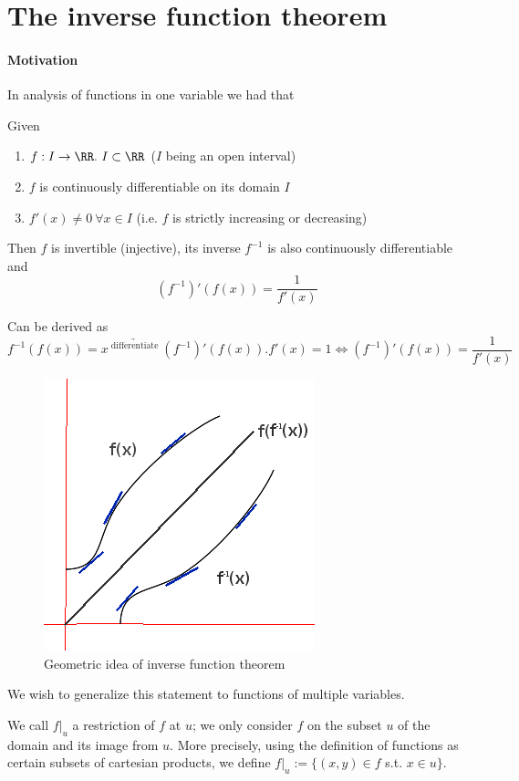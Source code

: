 \section[The inverse function theorem]{The inverse function theorem}
\paragraph{Motivation}
In analysis of functions in one variable we had that
\begin{thm}
Given
\begin{enumerate}
  \item $f: I \rightarrow \RR.\ I \subset \RR$ ($I$ being an open interval)
  \item $f$ is continuously differentiable on its domain $I$
  \item $f'(x) \neq 0\  \forall x \in I$ (i.e. $f$ is strictly increasing or decreasing)
\end{enumerate}
Then $f$ is invertible (injective), its inverse $f^{-1}$ is also continuously differentiable and
$$(f^{-1})'(f(x)) = \frac{1}{f'(x)}$$
\end{thm}

\begin{rem}
  Can be derived as $$f^{-1}(f(x)) = x\ \underrightarrow{^\text{differentiate}}\ (f^{-1})'(f(x)).f'(x) = 1 \iff (f^{-1})'(f(x)) = \frac{1}{f'(x)}$$
  \end{rem}

\begin{figure}[hb]
  \center
\caption{Geometric idea of inverse function theorem}
\includegraphics[scale=0.6]{figures/invfuncthm}
\end{figure}

We wish to generalize this statement to functions of multiple variables.
\begin{ldefn}
  We call $f|_u$ a restriction of $f$ at $u$; we only consider $f$ on the subset $u$ of the domain and its image from $u$.
  More precisely, using the definition of functions as certain subsets of cartesian products, we define $f|_u:=\{(x,y)\in f$ s.t. $x\in u\}$.
\end{ldefn}

